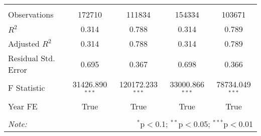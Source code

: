 \begin{tabular}{@{\extracolsep{5pt}}lcccc}
\hline \\[-1.8ex]
 Observations & 172710 & 111834 & 154334 & 103671\\
 $R^2$ & 0.314 & 0.788 & 0.314 & 0.789 \\
 Adjusted $R^2$ & 0.314 & 0.788 & 0.314 & 0.789 \\
 Residual Std. Error & 0.695  & 0.367  & 0.698  & 0.366  \\
 F Statistic & 31426.890$^{***}$  & 120172.233$^{***}$  & 33000.866$^{***}$  & 78734.049$^{***}$  \\
    Year FE & True & True & True & True \\
\hline
\hline \\[-1.8ex]
\textit{Note:} & \multicolumn{4}{r}{$^{*}$p$<$0.1; $^{**}$p$<$0.05; $^{***}$p$<$0.01} \\
\end{tabular}
